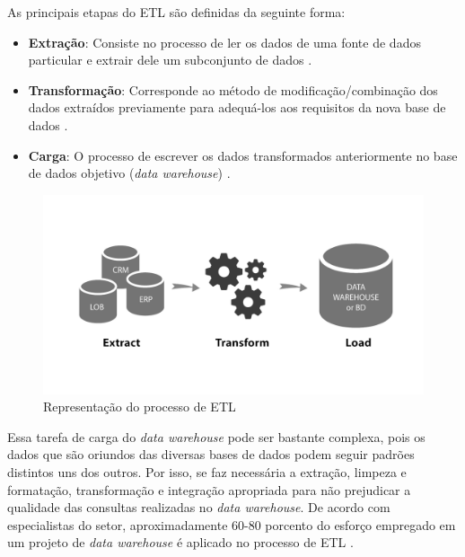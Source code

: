 As principais etapas do ETL são definidas da seguinte forma:

\begin{itemize}
  \item \textbf{Extração}: Consiste no processo de ler os dados de uma fonte de dados particular e extrair dele um subconjunto de dados \cite{goarETL}.
  \item \textbf{Transformação}: Corresponde ao método de modificação/combinação dos dados extraídos previamente para adequá-los aos requisitos da nova base de dados \cite{goarETL}.
  \item \textbf{Carga}: O processo de escrever os dados transformados anteriormente no base de dados objetivo (\textit{data warehouse}) \cite{goarETL}.
\end{itemize} 

\begin{figure}[ht]
\centering
\includegraphics[width=1\textwidth]{imagens/etl-processo.png}
\caption{Representação do processo de ETL}
\author{Fonte: https://blog.indicium.tech/etl-vs-elt-diferencas/}
\label{fig:processoETL}
\end{figure}

Essa tarefa de carga do \textit{data warehouse} pode ser bastante complexa, pois os dados que são oriundos das diversas bases de dados podem seguir padrões distintos uns dos outros. Por isso, se faz necessária a extração, limpeza e formatação, transformação e integração apropriada para não prejudicar a qualidade das consultas realizadas no \textit{data warehouse}. De acordo com especialistas do setor, aproximadamente 60-80 porcento do esforço empregado em um projeto de \textit{data warehouse} é aplicado no processo de ETL \cite{goarETL}.

